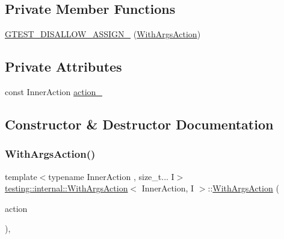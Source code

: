 \subsection*{Private Member Functions}
\begin{DoxyCompactItemize}
\item 
\mbox{\hyperlink{structtesting_1_1internal_1_1_with_args_action_a6f3ce8a08ec91bb8012f86f29f42145e}{G\+T\+E\+S\+T\+\_\+\+D\+I\+S\+A\+L\+L\+O\+W\+\_\+\+A\+S\+S\+I\+G\+N\+\_\+}} (\mbox{\hyperlink{structtesting_1_1internal_1_1_with_args_action}{With\+Args\+Action}})
\end{DoxyCompactItemize}
\subsection*{Private Attributes}
\begin{DoxyCompactItemize}
\item 
const Inner\+Action \mbox{\hyperlink{structtesting_1_1internal_1_1_with_args_action_ae106c813aa3c4b2fb3398933d07c9cce}{action\+\_\+}}
\end{DoxyCompactItemize}


\subsection{Constructor \& Destructor Documentation}
\mbox{\label{structtesting_1_1internal_1_1_with_args_action_a506fcbb1bccdf29c89b44af65adb4c14}} 
\subsubsection{\texorpdfstring{WithArgsAction()}{WithArgsAction()}}
{\footnotesize\ttfamily template$<$typename Inner\+Action , size\+\_\+t... I$>$ \\
\mbox{\hyperlink{structtesting_1_1internal_1_1_with_args_action}{testing\+::internal\+::\+With\+Args\+Action}}$<$ Inner\+Action, I $>$\+::\mbox{\hyperlink{structtesting_1_1internal_1_1_with_args_action}{With\+Args\+Action}} (\begin{DoxyParamCaption}\item[{const Inner\+Action \&}]{action }\end{DoxyParamCaption})\hspace{0.3cm}{\ttfamily [inline]}, {\ttfamily [explicit]}}



